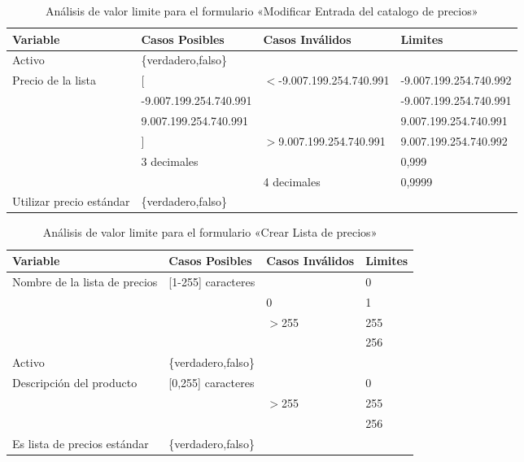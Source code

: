 \begin{table}
\centering
\begin{tabular}{|p{3.0cm}|p{4.0cm}|p{4.0cm}|l|}
\hline
\footnotesize{\textbf{Variable}} & \footnotesize{\textbf{Casos Posibles}} & \footnotesize{\textbf{Casos Inválidos}} & \footnotesize{\textbf{Limites}} \\
\hline
\footnotesize{Activo} & \footnotesize{\{verdadero,falso\}} & & \\
\hline
\footnotesize{Precio de la lista} & \footnotesize{[} & \footnotesize{$<$-9.007.199.254.740.991} & \footnotesize{-9.007.199.254.740.992} \\
& \footnotesize{-9.007.199.254.740.991} & & \footnotesize{-9.007.199.254.740.991} \\
& \footnotesize{9.007.199.254.740.991} & & \footnotesize{9.007.199.254.740.991} \\
& \footnotesize{]} & \footnotesize{$>$9.007.199.254.740.991} & \footnotesize{9.007.199.254.740.992} \\
& \footnotesize{3 decimales} & & \footnotesize{0,999} \\
& & \footnotesize{4 decimales} & \footnotesize{0,9999} \\
\hline
\footnotesize{Utilizar precio estándar} & \footnotesize{\{verdadero,falso\}} & & \\
\hline
\end{tabular}
\caption{Análisis de valor limite para el formulario «Modificar Entrada del catalogo de precios»}
\label{myers_04}
\end{table}

\begin{table}
\centering
\begin{tabular}{|p{6.0cm}|l|l|l|}
\hline
\footnotesize{\textbf{Variable}} & \footnotesize{\textbf{Casos Posibles}} & \footnotesize{\textbf{Casos Inválidos}} & \footnotesize{\textbf{Limites}} \\
\hline
\footnotesize{Nombre de la lista de precios} & \footnotesize{[1-255] caracteres} & & \footnotesize{0} \\
& & \footnotesize{0} & \footnotesize{1} \\
& & \footnotesize{$>$255} & \footnotesize{255} \\
& & & \footnotesize{256} \\
\hline
\footnotesize{Activo} & \footnotesize{\{verdadero,falso\}} & & \\
\hline
\footnotesize{Descripción del producto} & \footnotesize{[0,255] caracteres} & & \footnotesize{0} \\
& & \footnotesize{$>$255} & \footnotesize{255} \\
& & & \footnotesize{256} \\
\hline
\footnotesize{Es lista de precios estándar} & \footnotesize{\{verdadero,falso\}} & & \\
\hline
\end{tabular}
\caption{Análisis de valor limite para el formulario «Crear Lista de precios»}
\label{myers_05}
\end{table}

